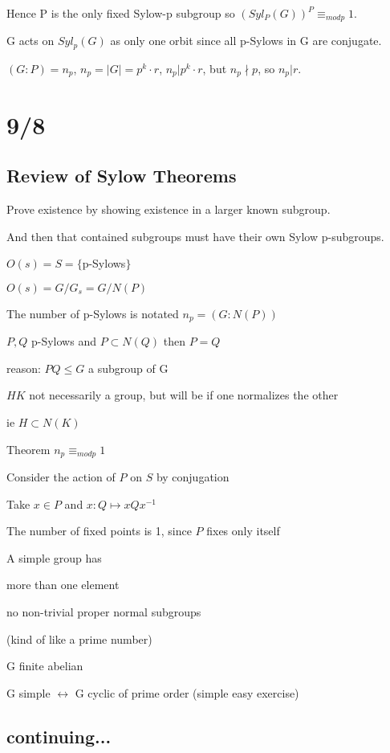 \documentclass[12pt]{article}
\newcommand{\inv}{^{-1}}
\begin{document}
Hence P is the only fixed Sylow-p subgroup so $(Syl_P(G))^P \equiv_{mod p} 1$.

G acts on $Syl_p(G)$ as only one orbit since all p-Sylows in G are conjugate.

$(G : P) = n_p$, $n_p = |G| = p^k \cdot r$, $n_p | p^k \cdot r$, but $n_p \nmid p$, so $n_p | r$.

\section{9/8}

\subsection{Review of Sylow Theorems}

Prove existence by showing existence in a larger known subgroup.

And then that contained subgroups must have their own Sylow p-subgroups.

$O(s) = S = \{$p-Sylows$\}$

$O(s) = G\slash G_s = G \slash N(P)$

The number of p-Sylows is notated $n_p = (G : N(P))$

\noindent
$P, Q$ p-Sylows and $P \subset N(Q)$ then $P = Q$

reason: $PQ \leq G$ a subgroup of G

$HK$ not necessarily a group, but will be if one normalizes the other

ie $H \subset N(K)$

\noindent
Theorem $n_p \equiv_{mod p} 1$

Consider the action of $P$ on $S$ by conjugation

Take $x \in P$ and $x: Q \mapsto xQx\inv$

The number of fixed points is 1, since $P$ fixes only itself

\noindent
A simple group has

more than one element

no non-trivial proper normal subgroups

(kind of like a prime number)

\noindent
G finite abelian

G simple $\leftrightarrow$ G cyclic of prime order (simple easy exercise)

\subsection{continuing...}
\end{document}
